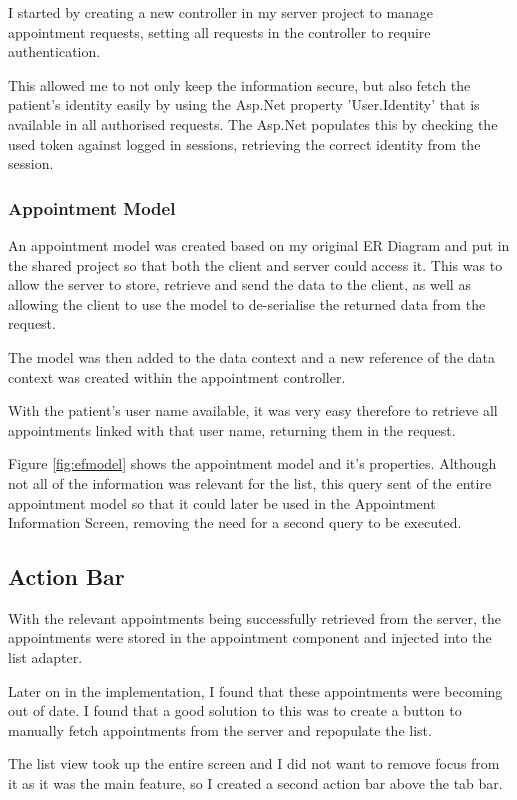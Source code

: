 I started by creating a new controller in my server project to manage appointment requests, setting all requests in the controller to require authentication.

This allowed me to not only keep the information secure, but also fetch the patient's identity easily by using the Asp.Net property 'User.Identity' that is available in all authorised requests. The Asp.Net populates this by checking the used token against logged in sessions, retrieving the correct identity from the session.

\subsubsection{Appointment Model}

An appointment model was created based on my original ER Diagram and put in the shared project so that both the client and server could access it. This was to allow the server to store, retrieve and send the data to the client, as well as allowing the client to use the model to de-serialise the returned data from the request. 

The model was then added to the data context and a new reference of the data context was created within the appointment controller.

With the patient's user name available, it was very easy therefore to retrieve all appointments linked with that user name, returning them in the request.

Figure \ref{fig:efmodel} shows the appointment model and it's properties. Although not all of the information was relevant for the list, this query sent of the entire appointment model so that it could later be used in the Appointment Information Screen, removing the need for a second query to be executed.

\subsection{Action Bar}

With the relevant appointments being successfully retrieved from the server, the appointments were stored in the appointment component and injected into the list adapter.

Later on in the implementation, I found that these appointments were becoming out of date. I found that a good solution to this was to create a button to manually fetch appointments from the server and repopulate the list.

The list view took up the entire screen and I did not want to remove focus from it as it was the main feature, so I created a second action bar above the tab bar.


